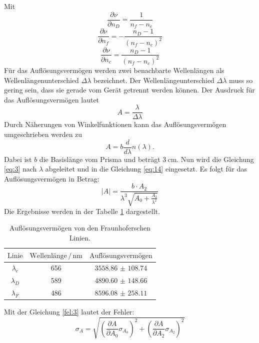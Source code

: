 Mit
\begin{equation*}
  \frac{\partial \nu}{\partial n_D} = \frac{1}{n_f - n_c}
\end{equation*}
\begin{equation*}
  \frac{\partial \nu}{\partial n_f} = -\frac{n_D - 1}{(n_f -n_c)^2}
\end{equation*}
\begin{equation*}
  \frac{\partial \nu}{\partial n_c} = \frac{n_D - 1}{(n_f -n_c)^2}
\end{equation*}
Für das Auflösungsvermögen werden zwei benachbarte Wellenlängen
als Wellenlängenunterschied $\Delta\lambda$ bezeichnet. Der Wellenlängeunterschied $\Delta\lambda$ muss
so gering sein, dass sie gerade vom Gerät getrennt werden können.
Der Ausdruck für das Auflösungsvermögen lautet
\begin{equation*}
  A = \frac{\lambda}{\Delta\lambda}
\end{equation*}
Durch Näherungen von Winkelfunktionen kann das Auflösungsvermögen umgeschrieben werden zu
\begin{equation}
  A = b \frac{d}{d\lambda} n(\lambda).
  \label{eq:14}
\end{equation}
Dabei ist $b$ die Basislänge vom Prisma und beträgt $\SI{3}{\centi\meter}$.
Nun wird die Gleichung \ref{eq:3} nach $\lambda$ abgeleitet und in die Gleichung \ref{eq:14}
eingesetzt.
Es folgt für das Auflösungsvermögen in Betrag:
\begin{equation}
  |A| = \frac{b \cdot A_2}{\lambda^3 \sqrt{A_0 +\frac{A_2}{\lambda^2}}}
\end{equation}
Die Ergebnisse werden in der Tabelle \ref{tab:4} dargestellt.
\begin{table}[H]
  \centering
  \caption{Auflösungsvermögen von den Fraunhoferschen Linien.}
  \label{tab:4}
  \begin{tabular}{c c c}
    \toprule
    $\text{Linie}$ & $\text{Wellenlänge} \,/\,\si{\nano\meter}$ & $\text{Auflösungsvermögen}$\\
    \midrule
    $\lambda_c$ & 656 & $\num{3558.86(10874)}$\\
    $\lambda_D$ & 589 & $\num{4890.60(14866)}$\\
    $\lambda_F$ & 486 & $\num{8596.08(25811)}$\\
    \bottomrule
  \end{tabular}
\end{table}
Mit der Gleichung \ref{fel:3} lautet der Fehler:
\begin{equation*}
  \sigma_A = \sqrt{(\frac{\partial A} {\partial A_0} \sigma_{A_0})^2 + (\frac{\partial A}{\partial A_2} \sigma_{A_2})^2}
\end{equation*}
